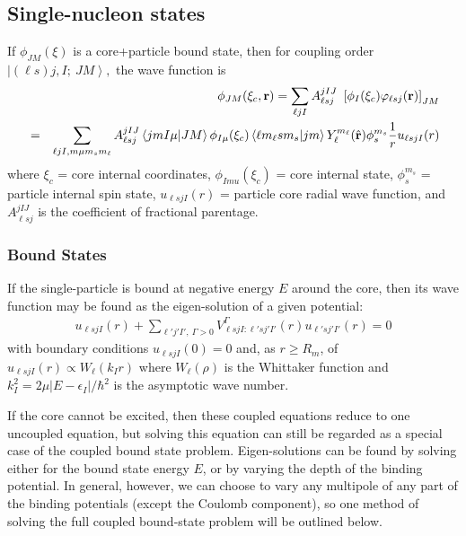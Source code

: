 \documentclass[11pt,a4paper]{article}
\newcommand{\vecr}{{\bf r}}
\begin{document}
\subsection{Single-nucleon states}

If $\phi_{JM} ( \xi ) $ is a core+particle bound state, then for coupling
order $ \left | ( \ell s)j,I;~JM \right\rangle , $
the wave function is
\begin{eqnarray}
 &&\phi_{JM} ( \xi_c , \vecr) =
   \sum_{\ell jI}  A_{\ell sj}^{jIJ} ~
     \left [\phi_I (\xi_c)  \varphi_{\ell sj} (\vecr) \right ]
     _{JM}
\\
   &=&
   \sum_{ {\ell jI} ,{m \mu m_s m_\ell}}
     A_{\ell sj}^{jIJ} \left\langle jmI \mu | JM \right\rangle
    \phi_{I \mu} (\xi_c )
              \left\langle \ell m_\ell s m_s | jm \right\rangle
        Y_\ell^{m_\ell} ( \hat \vecr)\phi_s^{m_s}
        \frac{1}{r} u_{\ell sjI} (r) \nonumber
\end{eqnarray}
where $ \xi_c $ = core internal coordinates,
      $\phi_{I mu} (\xi_c ) $ = core internal state,
      $\phi_s^{m_s} $ = particle internal spin state,
      $ u_{\ell sjI} (r) $ = particle core radial wave function,
and
$A_{\ell sj}^{jIJ}$ is the coefficient of fractional parentage.

\subsubsection{Bound States}

If the single-particle is bound at negative energy $E$ around the core,
then its wave function may be found as the eigen-solution of a
given potential:
\begin{eqnarray}
 [ T_\ell (r) + V (r) + \epsilon_I - E ]  u_{\ell sjI} (r)
    + \sum_{\ell' j' I', ~\Gamma>0 }
       V^\Gamma_{\ell sjI : \ell' s j' I' } (r)
            u_{\ell' s j' I'} (r) = 0
\end{eqnarray}
with boundary conditions $ u_{\ell sjI} (0) = 0 $ and,
as $ r \geq R_m $, of
$ u_{\ell sjI} (r) \propto W_{\ell} (k_I r) $
where $ W_\ell (\rho) $ is the Whittaker function
and $ k_I^2 = { 2 \mu |E - \epsilon_I | / \hbar^2 } $
is the asymptotic wave number.

If the core cannot be excited, then these coupled equations reduce
to one uncoupled equation,
but solving this equation can still be regarded as a special case of the
coupled bound state problem.
Eigen-solutions can be found by solving either for
the bound state energy $E$, or by varying the depth of the binding potential.
In general, however, we can choose to vary any multipole of any part of
the binding potentials (except the Coulomb component), so one method
of solving the full coupled bound-state problem will be outlined below.
\end{document}
